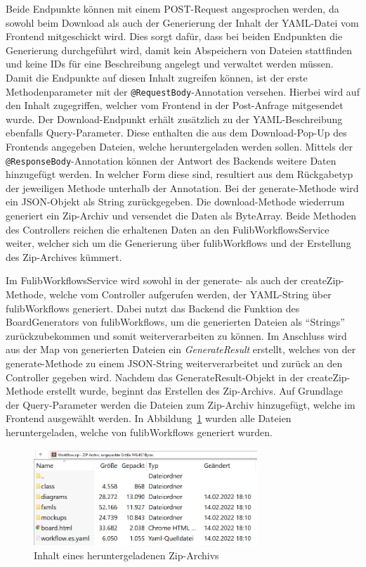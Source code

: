 Beide Endpunkte können mit einem POST-Request angesprochen werden, da sowohl beim Download als auch der Generierung der Inhalt der
YAML-Datei vom Frontend mitgeschickt wird.
Dies sorgt dafür, dass bei beiden Endpunkten die Generierung durchgeführt wird, damit kein Abspeichern von Dateien stattfinden und keine IDs für
eine Beschreibung angelegt und verwaltet werden müssen.
Damit die Endpunkte auf diesen Inhalt zugreifen können, ist der erste Methodenparameter mit der \texttt{@RequestBody}-Annotation versehen.
Hierbei wird auf den Inhalt zugegriffen, welcher vom Frontend in der Post-Anfrage mitgesendet wurde.
Der Download-Endpunkt erhält zusätzlich zu der YAML-Beschreibung ebenfalls Query-Parameter.
Diese enthalten die aus dem Download-Pop-Up des Frontends angegeben Dateien, welche heruntergeladen werden sollen.
Mittels der \texttt{@ResponseBody}-Annotation können der Antwort des Backends weitere Daten hinzugefügt werden.
In welcher Form diese sind, resultiert aus dem Rückgabetyp der jeweiligen Methode unterhalb der Annotation.
Bei der generate-Methode wird ein JSON-Objekt als String zurückgegeben.
Die download-Methode wiederrum generiert ein Zip-Archiv und versendet die Daten als ByteArray.
Beide Methoden des Controllers reichen die erhaltenen Daten an den FulibWorkflowsService weiter, welcher sich um die Generierung über fulibWorkflows
und der Erstellung des Zip-Archives kümmert.

Im FulibWorkflowsService wird sowohl in der generate- als auch der createZip-Methode, welche vom Controller aufgerufen werden,
der YAML-String über fulibWorkflows generiert.
Dabei nutzt das Backend die Funktion des BoardGenerators von fulibWorkflows, um die generierten Dateien als ``Strings'' zurückzubekommen und somit weiterverarbeiten zu können.
Im Anschluss wird aus der Map von generierten Dateien ein \textit{GenerateResult} erstellt, welches von der generate-Methode zu einem JSON-String weiterverarbeitet und zurück an den Controller gegeben wird.
Nachdem das GenerateResult-Objekt in der createZip-Methode erstellt wurde, beginnt das Erstellen des Zip-Archivs.
Auf Grundlage der Query-Parameter werden die Dateien zum Zip-Archiv hinzugefügt, welche im Frontend ausgewählt werden.
In Abbildung~\ref{fig:export} wurden alle Dateien heruntergeladen, welche von fulibWorkflows generiert wurden.

\begin{figure}[h]
    \centering
    \includegraphics[width=0.75\textwidth]{images/3.3/export}
    \caption{Inhalt eines heruntergeladenen Zip-Archivs}
    \label{fig:export}
\end{figure}

